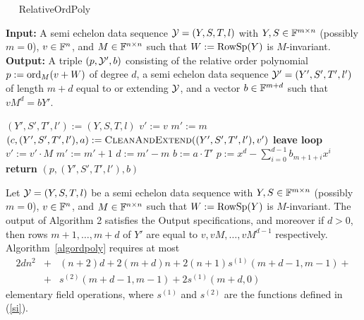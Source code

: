 \begin{algorithm}[t]
\caption{$\quad$ \sc RelativeOrdPoly}
\label{algordpoly}
%
\begin{algorithmic}
\STATE \textbf{Input:} A semi echelon data sequence $\mathcal{Y}=(Y,S,T,l)$ with 
$Y,S \in \mathbb{F}^{m \times n}$ (possibly $m=0$),
$v \in \mathbb{F}^n$, 
and $M \in \mathbb{F}^{n \times n}$ such that $W:=\mathrm{RowSp}(Y)$ is $M$-invariant.
\STATE \textbf{Output:} A triple $(p,\mathcal{Y}',b)$ consisting of the
relative order polynomial $p := \mathrm{ord}_M(v+W)$ of degree $d$,
a semi echelon data sequence $\mathcal{Y}'=(Y',S',T',l')$ of length $m+d$ equal
to or extending $\mathcal{Y}$, and a vector $b \in \mathbb{F}^{m+d}$ such that $vM^d =
bY'$.

\vspace*{2mm}
\STATE $(Y',S',T',l') := (Y,S,T,l)$ \hspace*{2mm}
\STATE $v' := v$
\STATE $m' := m$ \hspace*{3.08cm}  
\LOOP
    \STATE $(c,(Y',S',T',l'),a) := \mbox{\sc CleanAndExtend}((Y',S',T',l'),v')$  
    \STATE \hspace*{5cm} 
        \STATE \textbf{leave loop}
    \ENDIF
    \STATE $v' := v' \cdot M$
     \STATE $m' := m' +1$	
\ENDLOOP \hspace*{1.5cm}  
\STATE $d := m'-m$
\STATE $b := a\cdot T'$
\STATE $p :=x^d-\sum_{i=0}^{d-1} b_{m+1+i} x^i$
\STATE \textbf{return} $(p, (Y',S',T',l'),b)$
\end{algorithmic}
\end{algorithm}

\begin{Prop}
\label{proprelorderpol}
%
Let\/ $\mathcal{Y}=(Y,S,T,l)$ be a semi echelon data sequence 
with $Y,S \in \mathbb{F}^{m \times
n}$ (possibly $m=0$), $v \in \mathbb{F}^n$, and $M \in \mathbb{F}^{n \times n}$
such that $W:=\mathrm{RowSp}(Y)$ is $M$-invariant. 
The output of Algorithm 2 satisfies the Output specifications, and
moreover if $d>0$, then
rows $m+1, \ldots, m+d$ of $Y'$ are equal to $v,vM,\ldots,vM^{d-1}$
respectively.
Algorithm~\ref{algordpoly} requires at most
\begin{eqnarray*}
2dn^2 &+& (n+2)d +2(m+d)n 
+ 2(n+1)s^{(1)}(m+d-1,m-1) +  \\
 &+& s^{(2)}(m+d-1,m-1) 
+ 2s^{(1)}(m+d,0)
\end{eqnarray*}
elementary field operations, where $s^{(1)}$ and $s^{(2)}$ are the
functions defined in (\ref{si}).
\end{Prop}

